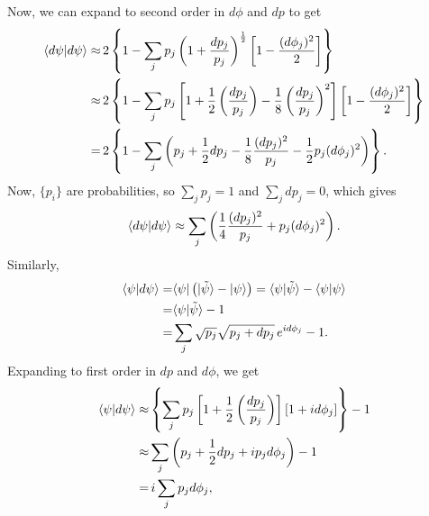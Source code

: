 Now, we can expand to second order in $d\phi$ and $dp$ to get
\begin{equation}
\begin{split}
    {\langle{d\psi}|{d\psi}\rangle}
        \approx& \,2\left\lbrace1 - \sum_jp_j\left(1+\frac{dp_j}{p_j}\right)^\frac{1}{2} 
                    \left[ 1 - \frac{(d\phi_j)^2}{2}\right]
            \right\rbrace\\
        \approx& \,2\left\lbrace1 - \sum_jp_j
                    \left[1+\frac{1}{2}\left(\frac{dp_j}{p_j}\right)
                           -\frac{1}{8}\left(\frac{dp_j}{p_j}\right)^2\right]
                    \left[ 1 - \frac{(d\phi_j)^2}{2}\right]
            \right\rbrace\\
        =& \,2\left\lbrace1 - \sum_j
                    \left( p_j + \frac{1}{2}dp_j 
                           -\frac{1}{8}\frac{(dp_j)^2}{p_j}
                           -\frac{1}{2}p_j(d\phi_j)^2
                    \right)
            \right\rbrace.\\
\end{split}
\end{equation}
Now, $\lbrace p_i\rbrace$ are probabilities, so $\sum_jp_j=1$ and $\sum_jdp_j = 0$,
which gives
\begin{equation}
    {\langle{d\psi}|{d\psi}\rangle}
        \approx \sum_j 
                    \left( 
                           \frac{1}{4}\frac{(dp_j)^2}{p_j}
                           +p_j(d\phi_j)^2
                    \right).
\end{equation}
%
Similarly, 
\begin{equation}
\begin{split}
    {\langle{\psi}|{d\psi}\rangle}
        =& {\langle{\psi}|} \left({|{\tilde\psi}\rangle} - {|{\psi}\rangle}\right)
        = {\langle{\psi}|{\tilde\psi}\rangle} - {\langle{\psi}|{\psi}\rangle}\\
        =& {\langle{\psi}|{\tilde\psi}\rangle} - 1\\
        =& \sum_j\sqrt{p_j}\sqrt{p_j+dp_j}\,e^{id\phi_j} - 1.
\end{split}
\end{equation}
Expanding to first order in $dp$ and $d\phi$, we get
\begin{equation}
\begin{split}
    {\langle{\psi}|{d\psi}\rangle}
        \approx& \left\lbrace \sum_jp_j
                    \left[1+\frac{1}{2}\left(\frac{dp_j}{p_j}\right)
                    \right]
                    \left[ 1 + id\phi_j 
                    \right]
                 \right\rbrace
            - 1\\ 
        \approx& \sum_j \left( p_j + \frac{1}{2}dp_j + ip_jd\phi_j
                  \right) -1\\
        =&\, i \sum_j p_jd\phi_j,
\end{split}
\end{equation}
